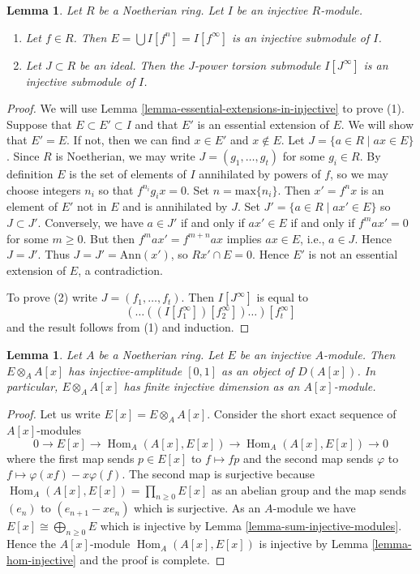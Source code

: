 \documentclass{stacks-project}
\theoremstyle{plain}
\newtheorem{lemma}[subsection]{Lemma}
\theoremstyle{definition}
\theoremstyle{remark}
\numberwithin{equation}{subsection}
\def\Hom{\mathop{\mathrm{Hom}}\nolimits}
\begin{document}
\begin{lemma}
\label{lemma-injective-module-divide}
Let $R$ be a Noetherian ring. Let $I$ be an injective $R$-module.
\begin{enumerate}
\item Let $f \in R$. Then $E = \bigcup I[f^n] = I[f^\infty]$
is an injective submodule of $I$.
\item Let $J \subset R$ be an ideal. Then the $J$-power torsion
submodule $I[J^\infty]$ is an injective submodule of $I$.
\end{enumerate}
\end{lemma}

\begin{proof}
We will use Lemma \ref{lemma-essential-extensions-in-injective}
to prove (1).
Suppose that $E \subset E' \subset I$ and that $E'$ is an essential
extension of $E$. We will show that $E' = E$. If not, then we can
find $x \in E'$ and $x \not \in E$.
Let $J = \{ a \in R \mid ax \in E\}$. Since $R$ is Noetherian,
we may write $J = (g_1, \ldots, g_t)$ for some
$g_i \in R$. By definition $E$ is the set of elements of $I$ annihilated
by powers of $f$, so we may choose integers $n_i$ so that $f^{n_i}g_ix = 0$.
Set $n = \mathrm{max}\{ n_i \}$. Then $x' = f^n x$ is an element of $E'$
not in $E$ and is annihilated by $J$. Set $J' = \{ a \in R \mid ax' \in E \}$
so $J \subset J'$. Conversely, we have $a \in J'$ if and only if $ax' \in E$
if and only if $f^m a x' = 0$ for some $m \geq 0$. But then
$f^m a x' = f^{m + n} a x$ implies $ax \in E$, i.e., $a \in J$.
Hence $J = J'$. Thus $J = J' = \text{Ann}(x')$, so $Rx' \cap E  = 0$.
Hence $E'$ is not an essential extension of $E$, a contradiction.

\medskip\noindent
To prove (2) write $J = (f_1, \ldots, f_t)$. Then
$I[J^\infty]$ is equal to
$$
(\ldots((I[f_1^\infty])[f_2^\infty])\ldots)[f_t^\infty]
$$
and the result follows from (1) and induction.
\end{proof}

\begin{lemma}
\label{lemma-injective-dimension-over-polynomial-ring}
Let $A$ be a Noetherian ring. Let $E$ be an injective $A$-module.
Then $E \otimes_A A[x]$ has injective-amplitude $[0, 1]$
as an object of $D(A[x])$. In particular, $E \otimes_A A[x]$
has finite injective dimension as an $A[x]$-module.
\end{lemma}

\begin{proof}
Let us write $E[x] = E \otimes_A A[x]$. Consider the short exact
sequence of $A[x]$-modules
$$
0 \to E[x] \to \Hom_A(A[x], E[x]) \to \Hom_A(A[x], E[x]) \to 0
$$
where the first map sends $p \in E[x]$ to $f \mapsto fp$ and the
second map sends $\varphi$ to $f \mapsto \varphi(xf) - x\varphi(f)$.
The second map is surjective because
$\Hom_A(A[x], E[x]) = \prod_{n \geq 0} E[x]$ as an abelian group and
the map sends $(e_n)$ to $(e_{n + 1} - xe_n)$ which is surjective.
As an $A$-module we have $E[x] \cong \bigoplus_{n \geq 0} E$
which is injective by Lemma \ref{lemma-sum-injective-modules}.
Hence the $A[x]$-module $\Hom_A(A[x], E[x])$ is injective by
Lemma \ref{lemma-hom-injective} and the proof is complete.
\end{proof}
\end{document}
